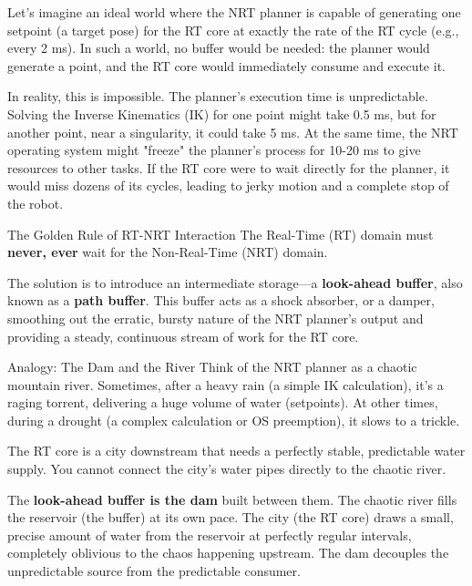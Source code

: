 Let's imagine an ideal world where the NRT planner is capable of generating one setpoint (a target pose) for the RT core at exactly the rate of the RT cycle (e.g., every 2 ms). In such a world, no buffer would be needed: the planner would generate a point, and the RT core would immediately consume and execute it.

In reality, this is impossible. The planner's execution time is unpredictable. Solving the Inverse Kinematics (IK) for one point might take 0.5 ms, but for another point, near a singularity, it could take 5 ms. At the same time, the NRT operating system might "freeze" the planner's process for 10-20 ms to give resources to other tasks. If the RT core were to wait directly for the planner, it would miss dozens of its cycles, leading to jerky motion and a complete stop of the robot.

\begin{principlebox}{The Golden Rule of RT-NRT Interaction}
The Real-Time (RT) domain must \textbf{never, ever} wait for the Non-Real-Time (NRT) domain.
\end{principlebox}

The solution is to introduce an intermediate storage—a \textbf{look-ahead buffer}, also known as a \textbf{path buffer}. This buffer acts as a shock absorber, or a damper, smoothing out the erratic, bursty nature of the NRT planner's output and providing a steady, continuous stream of work for the RT core.

\begin{tipbox}{Analogy: The Dam and the River}
Think of the NRT planner as a chaotic mountain river. Sometimes, after a heavy rain (a simple IK calculation), it's a raging torrent, delivering a huge volume of water (setpoints). At other times, during a drought (a complex calculation or OS preemption), it slows to a trickle.
    
The RT core is a city downstream that needs a perfectly stable, predictable water supply. You cannot connect the city's water pipes directly to the chaotic river.
    
The \textbf{look-ahead buffer is the dam} built between them. The chaotic river fills the reservoir (the buffer) at its own pace. The city (the RT core) draws a small, precise amount of water from the reservoir at perfectly regular intervals, completely oblivious to the chaos happening upstream. The dam decouples the unpredictable source from the predictable consumer.
\end{tipbox}

